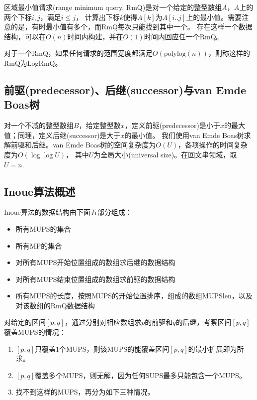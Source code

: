 区域最小值请求(range minimum query, RmQ)是对一个给定的整型数组$A$，$A$上的两个下标$i,j$，满足$i \leq j$，
计算出下标$k$使得$A[k]$为$A[i..j]$上的最小值。需要注意的是，有时最小值有多个，而RmQ每次只能找到其中一个。
存在这样一个数据结构，可以在$O(n)$时间内构建，并在$O(1)$时间内回应任一个RmQ。

对于一个RmQ，如果任何请求的范围宽度都满足$O(\mathrm{polylog}(n))$，则称这样的RmQ为LogRmQ。

\subsection{前驱(predecessor)、后继(successor)与van Emde Boas树}\label{subsec:van}

对一个不减的整型数组$B$，给定整型数$x$，定义前驱(predecessor)是小于$x$的最大值；同理，定义后继(successor)是大于$x$的最小值。
我们使用van Emde Boas树求解前驱和后继。van Emde Boas树的空间复杂度为$O(U)$，各项操作的时间复杂度为$O(\log\log U)$，
其中$U$为全局大小(universal size)\cite{Cormen3ed}。在回文串领域，取$U = n$.

\subsection{Inoue算法概述}\label{subsec:inoue}

Inoue算法\cite{Inoue2018}的数据结构由下面五部分组成：
\begin{itemize}
    \item 所有MUPS的集合
    \item 所有MP的集合
    \item 对所有MUPS开始位置组成的数组求后继的数据结构
    \item 对所有MUPS结束位置组成的数组求前驱的数据结构
    \item 所有MUPS的长度，按照MUPS的开始位置排序，组成的数组$\mathrm{MUPSlen}$，以及对该数组的RmQ数据结构
\end{itemize}

对给定的区间$[p,q]$，通过分别对相应数组求$p$的前驱和$q$的后继，考察区间$[p,q]$覆盖MUPS的情况：
\begin{enumerate}
    \item $[p,q]$只覆盖1个MUPS，则该MUPS的能覆盖区间$[p,q]$的最小扩展即为所求。
    \item $[p,q]$覆盖多个MUPS，则无解，因为任何SUPS最多只能包含一个MUPS\cite{Inoue2018}。
    \item 找不到这样的MUPS，再分为如下三种情况。
\end{enumerate}


